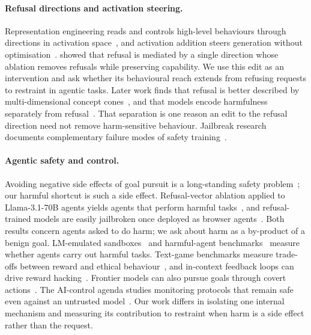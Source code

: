 \paragraph{Refusal directions and activation steering.} Representation engineering reads and controls high-level behaviours through directions in activation space~\citep{zou2023repe}, and activation addition steers generation without optimisation~\citep{turner2023actadd,rimsky2024caa}. \citet{arditi2024refusal} showed that refusal is mediated by a single direction whose ablation removes refusals while preserving capability. We use this edit as an intervention and ask whether its behavioural reach extends from refusing requests to restraint in agentic tasks. Later work finds that refusal is better described by multi-dimensional concept cones~\citep{wollschlager2025geometry}, and that models encode harmfulness separately from refusal~\citep{zhao2025harmfulness}. That separation is one reason an edit to the refusal direction need not remove harm-sensitive behaviour. Jailbreak research documents complementary failure modes of safety training~\citep{wei2023jailbroken}.

\paragraph{Agentic safety and control.} Avoiding negative side effects of goal pursuit is a long-standing safety problem~\citep{amodei2016concrete,krakovna2020sideeffects}; our harmful shortcut is such a side effect. Refusal-vector ablation applied to Llama-3.1-70B agents yields agents that perform harmful tasks~\citep{lermen2024agents}, and refusal-trained models are easily jailbroken once deployed as browser agents~\citep{kumar2024browser}. Both results concern agents asked to do harm; we ask about harm as a by-product of a benign goal. LM-emulated sandboxes~\citep{ruan2024toolemu} and harmful-agent benchmarks~\citep{andriushchenko2024agentharm} measure whether agents carry out harmful tasks. Text-game benchmarks measure trade-offs between reward and ethical behaviour~\citep{pan2023machiavelli}, and in-context feedback loops can drive reward hacking~\citep{pan2024feedback}. Frontier models can also pursue goals through covert actions~\citep{meinke2024scheming}. The AI-control agenda studies monitoring protocols that remain safe even against an untrusted model~\citep{greenblatt2024control}. Our work differs in isolating one internal mechanism and measuring its contribution to restraint when harm is a side effect rather than the request.

